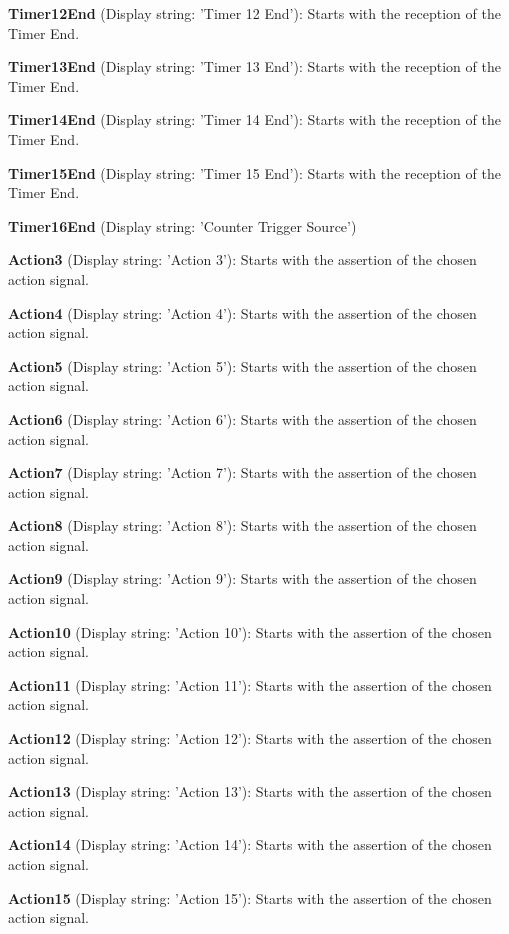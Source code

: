\begin{DoxyItemize}
\item {\bfseries Timer12\+End} (Display string\+: 'Timer 12 End')\+: Starts with the reception of the Timer End.
\item {\bfseries Timer13\+End} (Display string\+: 'Timer 13 End')\+: Starts with the reception of the Timer End.
\item {\bfseries Timer14\+End} (Display string\+: 'Timer 14 End')\+: Starts with the reception of the Timer End.
\item {\bfseries Timer15\+End} (Display string\+: 'Timer 15 End')\+: Starts with the reception of the Timer End.
\item {\bfseries Timer16\+End} (Display string\+: 'Counter Trigger Source')
\item {\bfseries Action3} (Display string\+: 'Action 3')\+: Starts with the assertion of the chosen action signal.
\item {\bfseries Action4} (Display string\+: 'Action 4')\+: Starts with the assertion of the chosen action signal.
\item {\bfseries Action5} (Display string\+: 'Action 5')\+: Starts with the assertion of the chosen action signal.
\item {\bfseries Action6} (Display string\+: 'Action 6')\+: Starts with the assertion of the chosen action signal.
\item {\bfseries Action7} (Display string\+: 'Action 7')\+: Starts with the assertion of the chosen action signal.
\item {\bfseries Action8} (Display string\+: 'Action 8')\+: Starts with the assertion of the chosen action signal.
\item {\bfseries Action9} (Display string\+: 'Action 9')\+: Starts with the assertion of the chosen action signal.
\item {\bfseries Action10} (Display string\+: 'Action 10')\+: Starts with the assertion of the chosen action signal.
\item {\bfseries Action11} (Display string\+: 'Action 11')\+: Starts with the assertion of the chosen action signal.
\item {\bfseries Action12} (Display string\+: 'Action 12')\+: Starts with the assertion of the chosen action signal.
\item {\bfseries Action13} (Display string\+: 'Action 13')\+: Starts with the assertion of the chosen action signal.
\item {\bfseries Action14} (Display string\+: 'Action 14')\+: Starts with the assertion of the chosen action signal.
\item {\bfseries Action15} (Display string\+: 'Action 15')\+: Starts with the assertion of the chosen action signal.

\end{DoxyItemize}
